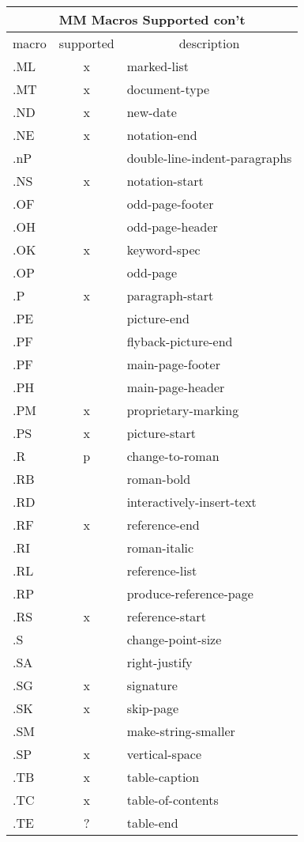 \noindent
\begin{center}
\begin{tabular}{|l|c|l|}
\hline
\multicolumn{3}{|c|}{{\vrule height12pt width0pt depth3.5pt\Large
MM Macros Supported con't}}\\ 
\hline\hline
macro&	 supported&\multicolumn{1}{|c|}{description}\\
\hline
.ML&	x&		marked-list\\
.MT&	x&		document-type\\
.ND&	x&		new-date\\
.NE&	x&		notation-end\\
.nP&	&		double-line-indent-paragraphs\\
.NS&	x&		notation-start\\
.OF&	&		odd-page-footer\\
.OH&	&		odd-page-header\\
.OK&	x&		keyword-spec\\
.OP&	&		odd-page\\
.P&	x&		paragraph-start\\
.PE&	&		picture-end\\
.PF&	&		flyback-picture-end\\
.PF&	&		main-page-footer\\
.PH&	&		main-page-header\\
.PM&	x&		proprietary-marking\\
.PS&	x&		picture-start\\
.R&	p&		change-to-roman\\
.RB&	&		roman-bold\\
.RD&	&		interactively-insert-text\\
.RF&	x&		reference-end\\
.RI&	&		roman-italic\\
.RL&	&		reference-list\\
.RP&	&		produce-reference-page\\
.RS&	x&		reference-start\\
.S&	&		change-point-size\\
.SA&	&		right-justify\\
.SG&	x&		signature\\
.SK&	x&		skip-page\\
.SM&	&		make-string-smaller\\
.SP&	x&		vertical-space\\
.TB&	x&		table-caption\\
.TC&	x&		table-of-contents\\
.TE&	?&		table-end\\

\end{tabular}
\end{center}
